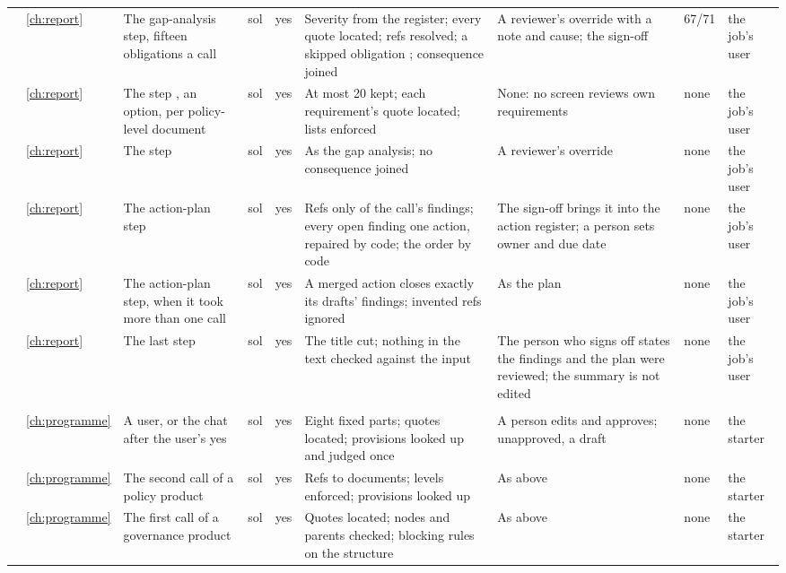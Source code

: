 \begin{landscape}
\begin{xltabular}{\linewidth}{@{}>{\scriptsize}L{31mm}>{\scriptsize}L{6mm}>{\scriptsize}L{36mm}>{\scriptsize}L{15mm}>{\scriptsize}L{9mm}>{\scriptsize}Y>{\scriptsize}L{38mm}>{\scriptsize}L{19mm}>{\scriptsize}L{25mm}@{}}
 & \ref{ch:report} & The gap-analysis step, fifteen obligations a call & sol & yes & Severity from the register; every quote located; refs resolved; a skipped obligation ; consequence joined & A reviewer's override with a note and cause; the sign-off &  67/71 & the job's user \\
 & \ref{ch:report} & The step , an option, per policy-level document & sol & yes & At most 20 kept; each requirement's quote located; lists enforced & None: no screen reviews own requirements & none & the job's user \\
 & \ref{ch:report} & The step  & sol & yes & As the gap analysis; no consequence joined & A reviewer's override & none & the job's user \\
 & \ref{ch:report} & The action-plan step & sol & yes & Refs only of the call's findings; every open finding one action, repaired by code; the order by code & The sign-off brings it into the action register; a person sets owner and due date & none & the job's user \\
 & \ref{ch:report} & The action-plan step, when it took more than one call & sol & yes & A merged action closes exactly its drafts' findings; invented refs ignored & As the plan & none & the job's user \\
 & \ref{ch:report} & The last step & sol & yes & The title cut; nothing in the text checked against the input & The person who signs off states the findings and the plan were reviewed; the summary is not edited & none & the job's user \\
\midrule
{} \\
 & \ref{ch:programme} & A user, or the chat after the user's yes & sol & yes & Eight fixed parts; quotes located; provisions looked up and judged once & A person edits and approves; unapproved, a draft & none & the starter \\
 & \ref{ch:programme} & The second call of a policy product & sol & yes & Refs to documents; levels enforced; provisions looked up & As above & none & the starter \\
 & \ref{ch:programme} & The first call of a governance product & sol & yes & Quotes located; nodes and parents checked; blocking rules on the structure & As above & none & the starter \\

\end{xltabular}
\end{landscape}
